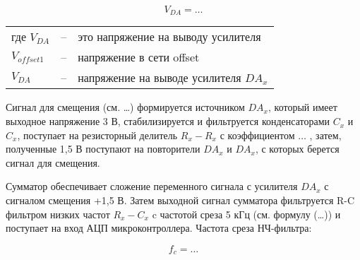 $$
V_{DA} = \ldots
$$


\begin{tabular}{lll}
	где $V_{DA}$ &--& это напряжение на выводу усилителя\\
	$V_{offset 1}$ &--& напряжение в сети offset\\
	$V_{DA}$ & -- & напряжение на выводе усилителя $DA_x$
\end{tabular}

Сигнал для смещения (см. \ldots) формируется источником {$DA_x$}, который имеет выходное напряжение 3 В, 
стабилизируется и фильтруется конденсаторами $C_x$ и $C_x$, поступает на резисторный делитель $R_x-R_x$ с коэффициентом $\ldots$ , 
затем, полученные 1,5 В поступают на повторители $DA_x$ и $DA_x$, с которых берется сигнал для смещения.


Сумматор обеспечивает сложение переменного сигнала с усилителя $DA_x$ с сигналом смещения +1,5 В. 
Затем выходной сигнал сумматора фильтруется R-C фильтром низких частот $R_x-C_x$ c частотой среза 5 кГц 
(см. формулу (\ldots)) и поступает на вход АЦП микроконтроллера.
Частота среза НЧ-фильтра:

$$
f_c = \ldots
$$


